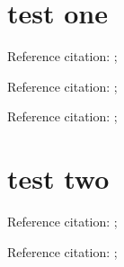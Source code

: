 \documentclass{article}
\begin{document}
 \tableofcontents
 
 \section{test one}
 Reference citation: \parencite{Foster2009}; 
 
 Reference citation: \parencite{Foster2009,Blundell2008}; 
 
 Reference citation: \parencite{Foster2009,Blundell2008,Suppa2018};
 
 
 \section{test two}
 Reference citation: \supercite{Foster2009}; 
 
 Reference citation: \supercite{Foster2009,Blundell2008}; 
 
 
 
 
 \printbibliography[heading=bibintoc,title={Reference}]
  
\end{document}
